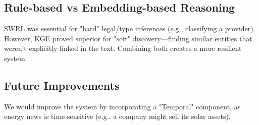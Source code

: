 \documentclass[11pt,a4paper]{article}
\begin{document}
\subsection{Rule-based vs Embedding-based Reasoning}
SWRL was essential for "hard" legal/type inferences (e.g., classifying a provider). However, KGE proved superior for "soft" discovery—finding similar entities that weren't explicitly linked in the text. Combining both creates a more resilient system.

\subsection{Future Improvements}
We would improve the system by incorporating a "Temporal" component, as energy news is time-sensitive (e.g., a company might sell its solar assets). 
\end{document}
